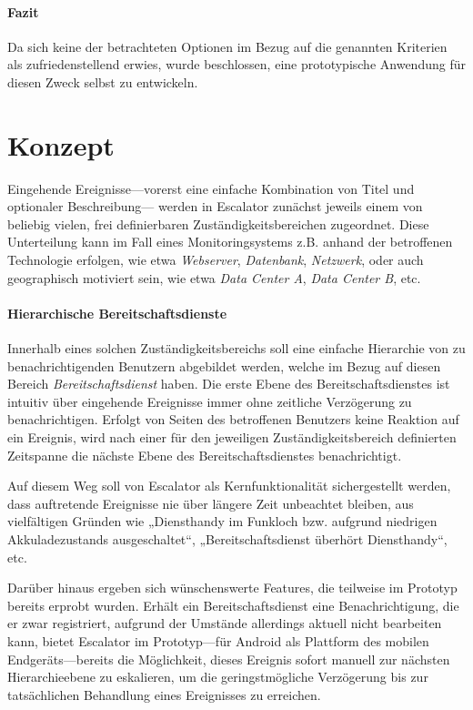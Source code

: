 \documentclass[11pt,utf8,notoc,bibnum,german,final]{zihpub}
\begin{document}
\paragraph{Fazit}

Da sich keine der betrachteten Optionen im Bezug auf die genannten Kriterien
als zufriedenstellend erwies, wurde beschlossen, eine prototypische Anwendung
für diesen Zweck selbst zu entwickeln.

\section{Konzept}
\label{concept}

Eingehende Ereignisse—vorerst eine einfache Kombination von Titel und
optionaler Beschreibung— werden in Escalator zunächst jeweils einem von
beliebig vielen, frei definierbaren Zuständigkeitsbereichen zugeordnet. Diese
Unterteilung kann im Fall eines Monitoringsystems z.B. anhand der betroffenen
Technologie erfolgen, wie etwa \emph{Webserver}, \emph{Datenbank},
\emph{Netzwerk}, oder auch geographisch motiviert sein, wie etwa \emph{Data
Center A}, \emph{Data Center B}, etc.

\paragraph{Hierarchische Bereitschaftsdienste}

Innerhalb eines solchen Zuständigkeitsbereichs soll eine einfache Hierarchie
von zu benachrichtigenden Benutzern abgebildet werden, welche im Bezug auf
diesen Bereich \emph{Bereitschaftsdienst} haben. Die erste Ebene des
Bereitschaftsdienstes ist intuitiv über eingehende Ereignisse immer ohne
zeitliche Verzögerung zu benachrichtigen. Erfolgt von Seiten des betroffenen
Benutzers keine Reaktion auf ein Ereignis, wird nach einer für den jeweiligen
Zuständigkeitsbereich definierten Zeitspanne die nächste Ebene des
Bereitschaftsdienstes benachrichtigt.

Auf diesem Weg soll von Escalator als Kernfunktionalität sichergestellt werden,
dass auftretende Ereignisse nie über längere Zeit unbeachtet bleiben, aus
vielfältigen Gründen wie „Diensthandy im Funkloch bzw. aufgrund niedrigen
Akkuladezustands ausgeschaltet“, „Bereitschaftsdienst überhört Diensthandy“,
etc.

Darüber hinaus ergeben sich wünschenswerte Features, die teilweise im Prototyp
bereits erprobt wurden. Erhält ein Bereitschaftsdienst eine Benachrichtigung,
die er zwar registriert, aufgrund der Umstände allerdings aktuell nicht
bearbeiten kann, bietet Escalator im Prototyp—für Android als Plattform des
mobilen Endgeräts—bereits die Möglichkeit, dieses Ereignis sofort manuell zur
nächsten Hierarchieebene zu eskalieren, um die geringstmögliche Verzögerung bis
zur tatsächlichen Behandlung eines Ereignisses zu erreichen.
\end{document}
